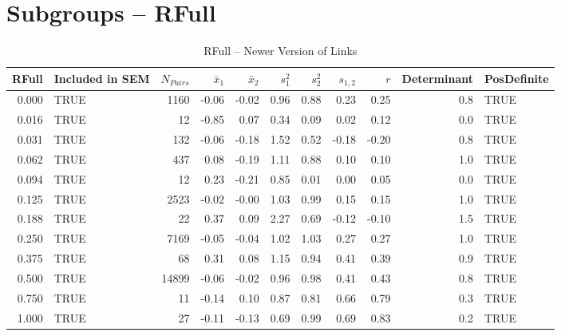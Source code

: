 \documentclass{article}\usepackage[]{graphicx}\usepackage[]{color}
\begin{document}
\section{Subgroups --  RFull }%
\begin{table}[ht]
\centering
\begin{tabular}{rlrrrrrrrrl}
  \hline
RFull & Included in SEM & $N_{Pairs}$ & $\bar{x}_1$ & $\bar{x}_2$ & $s_1^2$ & $s_2^2$ & $s_{1,2}$ & $r$ & Determinant & PosDefinite \\ 
  \hline
0.000 & TRUE & 1160 & -0.06 & -0.02 & 0.96 & 0.88 & 0.23 & 0.25 & 0.8 & TRUE \\ 
  0.016 & TRUE & 12 & -0.85 & 0.07 & 0.34 & 0.09 & 0.02 & 0.12 & 0.0 & TRUE \\ 
  0.031 & TRUE & 132 & -0.06 & -0.18 & 1.52 & 0.52 & -0.18 & -0.20 & 0.8 & TRUE \\ 
  0.062 & TRUE & 437 & 0.08 & -0.19 & 1.11 & 0.88 & 0.10 & 0.10 & 1.0 & TRUE \\ 
  0.094 & TRUE & 12 & 0.23 & -0.21 & 0.85 & 0.01 & 0.00 & 0.05 & 0.0 & TRUE \\ 
  0.125 & TRUE & 2523 & -0.02 & -0.00 & 1.03 & 0.99 & 0.15 & 0.15 & 1.0 & TRUE \\ 
  0.188 & TRUE & 22 & 0.37 & 0.09 & 2.27 & 0.69 & -0.12 & -0.10 & 1.5 & TRUE \\ 
  0.250 & TRUE & 7169 & -0.05 & -0.04 & 1.02 & 1.03 & 0.27 & 0.27 & 1.0 & TRUE \\ 
  0.375 & TRUE & 68 & 0.31 & 0.08 & 1.15 & 0.94 & 0.41 & 0.39 & 0.9 & TRUE \\ 
  0.500 & TRUE & 14899 & -0.06 & -0.02 & 0.96 & 0.98 & 0.41 & 0.43 & 0.8 & TRUE \\ 
  0.750 & TRUE & 11 & -0.14 & 0.10 & 0.87 & 0.81 & 0.66 & 0.79 & 0.3 & TRUE \\ 
  1.000 & TRUE & 27 & -0.11 & -0.13 & 0.69 & 0.99 & 0.69 & 0.83 & 0.2 & TRUE \\ 
   \hline
\end{tabular}
\caption{RFull -- Newer Version of Links} 
\end{table}
\end{document}
